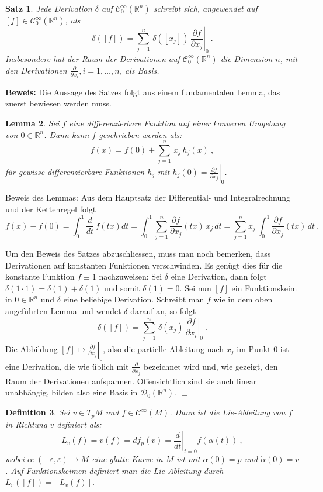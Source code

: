 \documentclass[12pt,a4paper]{article}
\def\R{\mathbb{R}}
\newtheorem{Lemma}{Lemma}[section]
\newtheorem{Satz}[Lemma]{Satz}
\newtheorem{Definition}[Lemma]{Definition}
\def\proof{\noindent\textbf{Beweis:}\quad}
\def\qed{\quad\hfill\ensuremath{\Box}}
\begin{document}
\bigskip

\begin{Satz}
Jede Derivation $\delta$ auf $\mathcal C^\infty_0(\R^n)$ schreibt sich, angewendet
auf $[f] \in \mathcal C^\infty_0(\R^n)$, als
$$
\delta ([f]) = \sum^n_{j=1}\, \delta([x_j])\, \left.\frac{\partial f}{\partial x_j}\right|_0  \ .
$$
Insbesondere hat der Raum der Derivationen auf $\mathcal C^\infty_0(\R^n)$ die Dimension $n$,
mit den Derivationen $\frac{\partial }{\partial x_i}, i=1,\ldots, n$, als Basis.
\end{Satz}
\proof
Die Aussage des Satzes folgt aus einem fundamentalen Lemma, das zuerst bewiesen werden muss.

\begin{Lemma}\label{analysis}
Sei $f$ eine differenzierbare Funktion auf einer konvexen Umgebung von $0\in \R^n$. Dann kann
$f$ geschrieben werden als:
$$
f(x) = f(0) + \sum^n_{j=1}\,x_j\,h_j(x) \ ,
$$
f\"ur gewisse differenzierbare Funktionen $h_j$ mit $h_j(0) = \left.\frac{\partial f}{\partial x_j} \right|_0$.
\end{Lemma}
Beweis des Lemmas: Aus dem Hauptsatz der Differential- und Integralrechnung und der Kettenregel folgt
$$
f(x) - f(0) = \int^1_0 \frac{d}{dt} \, f(tx) dt = \int^1_0 \sum^n_{j=1} \frac{\partial f}{\partial x_j}
(tx)\,x_j \, dt
= \sum^n_{j=1} x_j\, \int^1_0 \frac{\partial f}{\partial x_j} (tx)\, dt \ .
$$

Um den Beweis des Satzes abzuschliessen, muss man noch bemerken, dass Derivationen auf konstanten
Funktionen verschwinden. Es gen\"ugt dies f\"ur die konstante Funktion $f\equiv 1$ nachzuweisen:
Sei $\delta$ eine Derivation, dann folgt $\delta(1\cdot 1)=\delta(1) + \delta(1)$ und somit
$\delta(1)=0$. Sei nun $[f]$ ein Funktionskeim in $0\in \R^n$ und $\delta$ eine beliebige Derivation.
Schreibt man $f$ wie in dem oben angef\"uhrten Lemma und wendet $\delta$ darauf an, so folgt
$$
\delta([f]) = \sum^n_{j=1}\, \delta(x_j)\, \left.\frac{\partial f}{\partial x_i} \right|_0 \ .
$$
Die Abbildung $[f] \mapsto \left.\frac{\partial f}{\partial x_j} \right|_0$, also die partielle
Ableitung nach $x_j$ im Punkt $0$ ist eine Derivation, die wie \"ublich mit $\frac{\partial }{\partial x_j} $
bezeichnet wird und, wie gezeigt, den Raum der Derivationen aufspannen. Offensichtlich sind sie
auch linear unabh\"angig, bilden also eine Basis in $\mathcal D_0(\R^n)$.
\qed


\bigskip


\begin{Definition}
Sei $v\in T_pM$ und $f\in \mathcal C^\infty(M)$. Dann ist die {\em Lie-Ableitung} von $f$ in Richtung
$v$ definiert als:
$$
L_v(f) = v(f) = df_p(v) = \left.\frac{d}{dt}\right|_{t=0} f(\alpha(t)) \ ,
$$
wobei $\alpha : (-\varepsilon, \varepsilon)\rightarrow M$ eine glatte Kurve in $M$ ist mit
$\alpha(0)=p$ und $\dot \alpha(0)=v$. Auf Funktionskeimen definiert man die Lie-Ableitung
durch $L_v([f]) = [L_v(f)]$.
\end{Definition}
\end{document}
